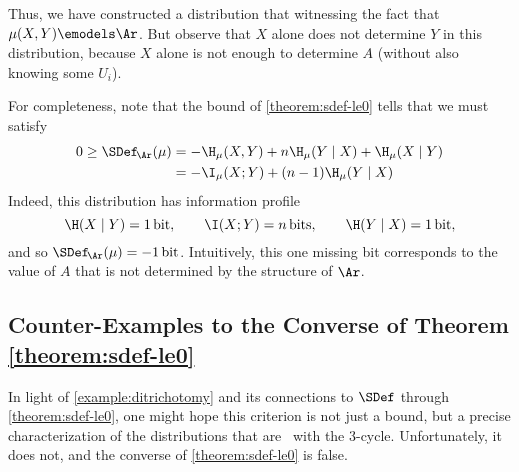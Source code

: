 \begin{subappendices}
\begin{example}
    Thus, we have constructed a distribution that witnessing the fact that $\mu(X,Y) \emodels \Ar$.      
    But observe that $X$ alone does not determine $Y$ in this distribution, because $X$ alone is not enough to determine $A$ (without also knowing some $U_i$). 
        
    For completeness, note that the bound of \cref{theorem:sdef-le0} tells that
    we must satisfy 
    \begin{align*}
    0 \ge
        \SDef_{\!\Ar}(\mu)
        &= - \H_\mu(X,Y) + n \H_\mu(Y \mid  X) + \H_\mu(X \mid Y) \\
        &= - \I_\mu(X;Y) + (n-1) \H_\mu(Y \mid X)  
    \end{align*}
    Indeed, this distribution has information profile 
    \[
        \H(X \mid Y) = 1\,\text{bit},\qquad
        \I(X ; Y) = n\,\text{bits},\qquad
        \H(Y \mid X) = 1\,\text{bit},
    \]
    and so $\SDef_{\!\Ar}(\mu) = -1\,\text{bit}$. 
    Intuitively, this one missing bit corresponds to the value of $A$ that is not determined by the structure of $\Ar$.
\end{example}


\subsection{Counter-Examples to the Converse of Theorem \ref{theorem:sdef-le0}}
    \label{appendix:converse-sdef-le0}

In light of 
\cref{example:ditrichotomy}
and its connections to 
$\SDef$
through \cref{theorem:sdef-le0},
one might hope this criterion is not just a bound, but
    a precise characterization of the distributions that are \scible\ 
    with the 3-cycle. 
Unfortunately, it does not, and the converse of \cref{theorem:sdef-le0} is false.


\end{subappendices}
